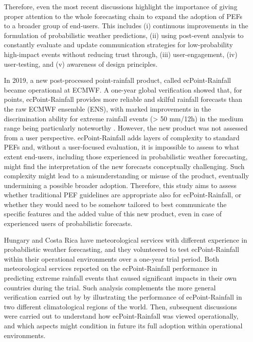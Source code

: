 Therefore, even the most recent discussions \citep{Zhang2019}  highlight the importance of giving proper attention to the whole forecasting chain to expand the adoption of PEFs to a broader group of end-users. This includes (i) continuous improvements in the formulation of probabilistic weather predictions, (ii) using post-event analysis to constantly evaluate and update communication strategies for low-probability high-impact events without reducing trust through, (iii) user-engagement, (iv) user-testing, and (v) awareness of design principles. \par
In 2019, a new post-processed point-rainfall product, called ecPoint-Rainfall became operational at ECMWF. A one-year global verification showed that, for points, ecPoint-Rainfall provides more reliable and skilful rainfall forecasts than the raw ECMWF ensemble (ENS), with marked improvements in the discrimination ability for extreme rainfall events (> 50 mm/12h) in the medium range being particularly noteworthy \citep{Hewson2020a}. However, the new product was not assessed from a user perspective. ecPoint-Rainfall adds layers of complexity to standard PEFs and, without a user-focused evaluation, it is impossible to assess to what extent end-users, including those experienced in probabilistic weather forecasting, might find the interpretation of the new forecasts conceptually challenging. Such complexity might lead to a misunderstanding or misuse of the product, eventually undermining a possible broader adoption. Therefore, this study aims to assess whether traditional PEF guidelines are appropriate also for ecPoint-Rainfall, or whether they would need to be somehow tailored to best communicate the specific features and the added value of this new product, even in case of experienced users of probabilistic forecasts. \par
Hungary and Costa Rica have meteorological services with different experience in probabilistic weather forecasting, and they volunteered to test ecPoint-Rainfall within their operational environments over a one-year trial period. Both  meteorological services reported on the ecPoint-Rainfall performance in predicting extreme rainfall events that caused significant impacts in their own countries during the trial. Such analysis complements the more general verification carried out by \citet{Hewson2020a} by illustrating the performance of ecPoint-Rainfall in two different climatological regions of the world. Then, subsequent discussions were carried out to understand how ecPoint-Rainfall was viewed  operationally, and which aspects might condition in future its full adoption within operational environments. \par
